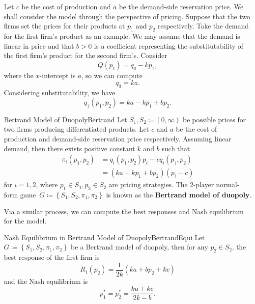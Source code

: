 \documentclass[math]{amznotes}
\theoremstyle{remark}
\begin{document}
Let $c$ be the cost of production and $a$ be the demand-side reservation price. We shall consider the model through the perspective of pricing. Suppose that the two firms set the prices for their products at $p_1$ and $p_2$ respectively. Take the demand for the first firm's product as an example. We may assume that the demand is linear in price and that $b > 0$ is a coefficient representing the substitutability of the first firm's product for the second firm's. Consider
\begin{equation*}
    Q\left(p_1\right) = q_0 - kp_1,
\end{equation*}
where the $x$-intercept is $a$, so we can compute 
\begin{equation*}
    q_0 = ka.
\end{equation*}
Considering substitutability, we have 
\begin{equation*}
    q_1\left(p_1, p_2\right) = ka - kp_1 + bp_2.
\end{equation*}
\begin{dfnbox}{Bertrand Model of Duopoly}{Bertrand}
    Let $S_1, S_2 \coloneqq \left[0, \infty\right)$ be possible prices for two firms producing differentiated products. Let $c$ and $a$ be the cost of production and demand-side reservation price respectively. Assuming linear demand, then there exists positive constant $k$ and $b$ such that 
    \begin{align*}
        \pi_i\left(p_1, p_2\right) & = q_i\left(p_1, p_2\right)p_i - cq_i\left(p_1, p_2\right) \\
        & = \left(ka - kp_1 + bp_2\right)\left(p_i - c\right)
    \end{align*}
    for $i = 1, 2$, where $p_1 \in S_1, p_2 \in S_2$ are pricing strategies. The $2$-player normal-form game~$G \coloneqq \left\{S_1, S_2, \pi_1, \pi_2\right\}$ is known as the {\color{red} \textbf{Bertrand model of duopoly}}. 
\end{dfnbox}
Via a similar process, we can compute the best responses and Nash equilibrium for the model.
\begin{probox}{Nash Equilibrium in Bertrand Model of Duopoly}{BertrandEqui}
    Let $G \coloneqq \left\{S_1, S_2, \pi_1, \pi_2\right\}$ be a Bertrand model of duopoly, then for any $p_2 \in S_2$, the best response of the first firm is
    \begin{equation*}
        R_1\left(p_2\right) = \frac{1}{2k}\left(ka + bp_2 + kc\right)
    \end{equation*} 
    and the Nash equilibrium is 
    \begin{equation*}
        p_1^* = p_2^* = \frac{ka + kc}{2k - b}.
    \end{equation*}
\end{probox}
\end{document}
